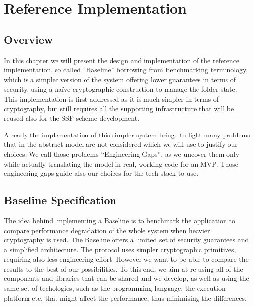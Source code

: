\chapter{Reference Implementation}\label{ch:reference-implementation}

\section{Overview}

In this chapter we will present the design and implementation of the reference implementation, 
so called ``Baseline'' borrowing from Benchmarking terminology, 
which is a simpler version of the system offering lower guarantees in terms of security,
using a na\"ive cryptographic construction to manage the folder state.
This implementation is first addressed as it is much simpler in terms of cryptography,
but still requires all the supporting infrastructure that will be reused also for the SSF scheme development.

Already the implementation of this simpler system brings to light many problems that in the abstract model are not considered which we will use to justify our choices.
We call those problems ``Engineering Gaps'', as we uncover them only while actually translating the model in real, working code for an MVP.
Those engineering gaps guide also our choices for the tech stack to use.

\section{Baseline Specification}\label{sc:baseline-specification}

The idea behind implementing a Baseline is to benchmark the application to compare performance degradation of the whole system when heavier cryptography is used.
The Baseline offers a limited set of security guarantees and a simplified architecture. 
The protocol uses simpler cryptographic primitives, requiring also less engineering effort.
However we want to be able to compare the results to the best of our possibilities. 
To this end, we aim at re-using all of the components and libraries that can be shared and we develop,
as well as using the same set of techologies, such as the programming language, the execution platform etc, 
that might affect the performance, thus minimising the differences.

